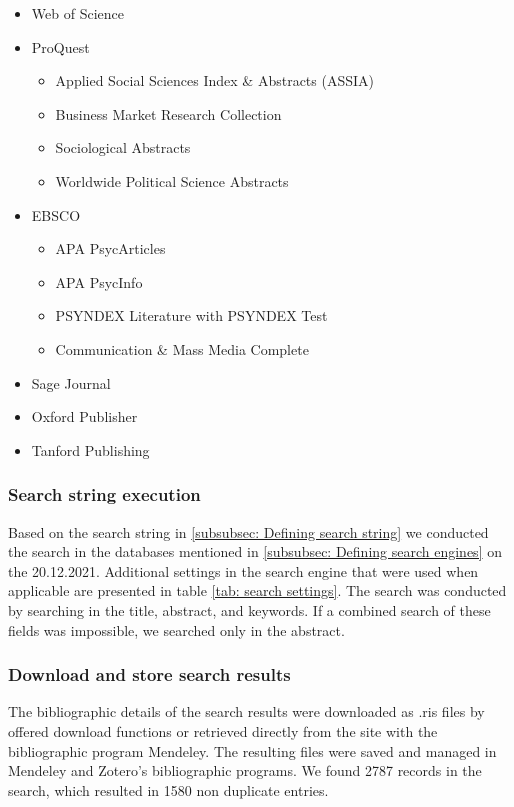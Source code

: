 \begin{itemize}
    \item  Web of Science
    \item ProQuest
    \begin{itemize}
        \item Applied Social Sciences Index \& Abstracts (ASSIA)
        \item Business Market Research Collection
        \item Sociological Abstracts
        \item Worldwide Political Science Abstracts
    \end{itemize}
    \item EBSCO
    \begin{itemize}
        \item APA PsycArticles
        \item APA PsycInfo
        \item PSYNDEX Literature with PSYNDEX Test
        \item Communication \& Mass Media Complete
    \end{itemize}
    \item Sage Journal
    \item Oxford Publisher
    \item Tanford Publishing
\end{itemize}

\subsubsection{Search string execution}

Based on the search string in \ref{subsubsec: Defining search string} we conducted the search in the databases mentioned in \ref{subsubsec: Defining search engines} on the 20.12.2021. Additional settings in the search engine that were used when applicable are presented in table \ref{tab: search settings}. The search was conducted by searching in the title, abstract, and keywords. If a combined search of these fields was impossible, we searched only in the abstract.

\subsubsection{Download and store search results}

The bibliographic details of the search results were downloaded as .ris files by offered download functions or retrieved directly from the site with the bibliographic program Mendeley. The resulting files were saved and managed in Mendeley and Zotero's bibliographic programs. We found 2787 records in the search, which resulted in 1580 non duplicate entries.



